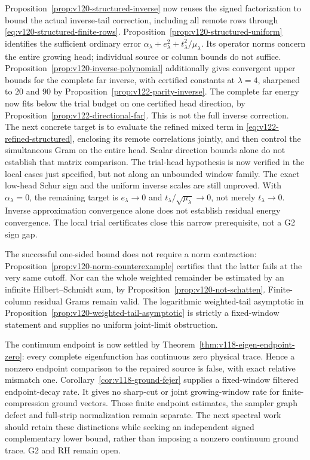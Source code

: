 \documentclass[11pt]{article}
\theoremstyle{remark}
\begin{document}
Proposition~\ref{prop:v120-structured-inverse} now reuses the signed
factorization to bound the actual inverse-tail correction, including
all remote rows through \eqref{eq:v120-structured-finite-rows}.
Proposition~\ref{prop:v120-structured-uniform} identifies the sufficient
ordinary error $\alpha_\lambda+e_\lambda^2+
 t_\lambda^2/\mu_\lambda$. Its operator norms concern the entire
growing head; individual source or column bounds do not suffice.
Proposition~\ref{prop:v120-inverse-polynomial} additionally gives
convergent upper bounds for the complete far inverse, with certified
constants at $\lambda=4$, sharpened to $20$ and $90$ by
Proposition~\ref{prop:v122-parity-inverse}. The complete far energy
now fits below the trial budget on one certified head direction,
by Proposition~\ref{prop:v122-directional-far}. This is not the full
inverse correction. The next concrete target is to evaluate the
refined mixed term in \eqref{eq:v122-refined-structured}, enclosing
its remote correlations jointly, and then control the simultaneous
Gram on the entire head. Scalar direction bounds alone do not
establish that matrix comparison.
The trial-head hypothesis is now verified in the local cases just
specified, but not along an unbounded window family. The exact low-head
Schur sign and the uniform inverse scales are still unproved. With
$\alpha_\lambda=0$, the remaining target is $e_\lambda\to0$ and
$t_\lambda/\sqrt{\mu_\lambda}\to0$, not merely $t_\lambda\to0$.
Inverse approximation convergence alone does not establish residual
energy convergence. The local trial certificates close this narrow
prerequisite, not a G2 sign gap.

The successful one-sided bound does not require a norm contraction:
Proposition~\ref{prop:v120-norm-counterexample} certifies that the
latter fails at the very same cutoff. Nor can the whole weighted
remainder be estimated by an infinite Hilbert--Schmidt sum, by
Proposition~\ref{prop:v120-not-schatten}. Finite-column residual Grams
remain valid. The logarithmic weighted-tail asymptotic in
Proposition~\ref{prop:v120-weighted-tail-asymptotic} is strictly a
fixed-window statement and supplies no uniform joint-limit obstruction.

The continuum endpoint is now settled by
Theorem~\ref{thm:v118-eigen-endpoint-zero}: every complete eigenfunction
has continuous zero physical trace. Hence a nonzero endpoint comparison
to the repaired source is false, with exact relative mismatch one.
Corollary~\ref{cor:v118-ground-fejer} supplies a fixed-window filtered
endpoint-decay rate. It gives no sharp-cut or joint growing-window rate
for finite-compression ground vectors. Those finite endpoint estimates,
the sampler graph defect and full-strip normalization remain separate.
The next spectral work should retain these distinctions while seeking
an independent signed complementary lower bound, rather than imposing
a nonzero continuum ground trace. G2 and RH remain open.
\end{document}
